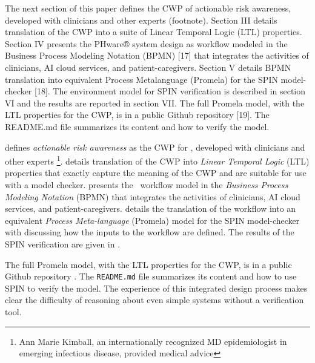 The next section of this paper defines the CWP of actionable risk awareness, developed with clinicians and other experts (footnote). Section III details translation of the CWP into a suite of Linear Temporal Logic (LTL) properties. Section IV presents the PHware® system design as workflow modeled in the Business Process Modeling Notation (BPMN) [17] that integrates the activities of clinicians, AI cloud services, and patient-caregivers. Section V details BPMN translation into equivalent Process Metalanguage (Promela) for the SPIN model-checker [18]. The environment model for SPIN verification is described in section VI and the results are reported in section VII. The full Promela model, with the LTL properties for the CWP, is in a public Github repository [19]. The README.md file summarizes its content and how to verify the model. 

 defines \emph{actionable risk awareness} as the CWP for \phware, developed with clinicians and other experts \footnote{Ann Marie Kimball, an internationally recognized MD epidemiologist in emerging infectious disease, provided medical advice}.
 details translation of the CWP into \emph{Linear Temporal Logic} (LTL) \cite{10.5555/975331} properties that exactly capture the meaning of the CWP and are suitable for use with a model checker.
 presents the \phware\ workflow model in the \emph{Business Process Modeling Notation} (BPMN) \cite{BPMN} that integrates the activities of clinicians, AI cloud services, and patient-caregivers.
 details the translation of the workflow into an equivalent \emph{Process Meta-language} (Promela) model for the SPIN model-checker \cite{spin} with  discussing how the inputs to the workflow are defined.
The results of the SPIN verification are given in .

The full Promela model, with the LTL properties for the CWP, is in a public Github repository \cite{repo}.
The \texttt{README.md} file summarizes its content and how to use SPIN to verify the model. 
The experience of this integrated design process makes clear the difficulty of reasoning about even simple systems without a verification tool.

